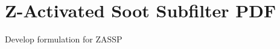 \section{Z-Activated Soot Subfilter PDF}
\label{sec:subfilter:zassp}

Develop formulation for ZASSP

